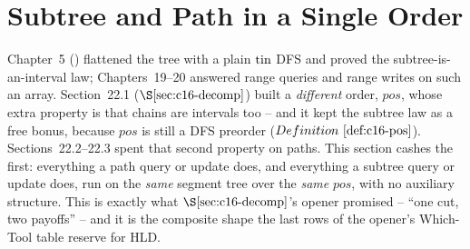 \section{Subtree and Path in a Single Order}\label{sec:c16-subpath}

\begin{previouslybox}
Chapter~5 () flattened the tree with a plain \(\operatorname{tin}\) DFS and proved the subtree-is-an-interval law; Chapters~19--20 answered range queries and range writes on such an array.  Section~22.1 (\(\secref{c16-decomp}\)) built a \emph{different} order, \(\mathit{pos}\), whose extra property is that chains are intervals too -- and it kept the subtree law as a free bonus, because \(\mathit{pos}\) is still a DFS preorder (\(\defref{c16-pos}\)).  Sections~22.2--22.3 spent that second property on paths.  This section cashes the first: everything a path query or update does, and everything a subtree query or update does, run on the \emph{same} segment tree over the \emph{same} \(\mathit{pos}\), with no auxiliary structure.  This is exactly what \(\secref{c16-decomp}\)'s opener promised -- ``one cut, two payoffs'' -- and it is the composite shape the last rows of the opener's Which-Tool table reserve for HLD.
\end{previouslybox}

